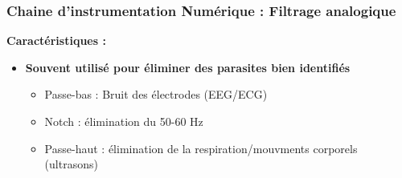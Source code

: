 \documentclass{beamer}
\begin{document}
\begin{frame}
\frametitle{Chaine d'instrumentation Numérique : Filtrage analogique}
\begin{center}
\end{center}
\vspace{0.1cm}
\textbf{Caractéristiques :}\\
\vspace{0.2cm}
\begin{itemize}
\item \textbf{Souvent utilisé pour éliminer des parasites bien identifiés }
\vspace{0.2cm}
\begin{itemize}
\item Passe-bas : Bruit des électrodes (EEG/ECG)
\vspace{0.2cm}
\item Notch : élimination du 50-60 Hz
\vspace{0.2cm}
\item Passe-haut : élimination de la respiration/mouvments corporels (ultrasons)
\end{itemize}
\end{itemize}
\end{frame}
\end{document}
